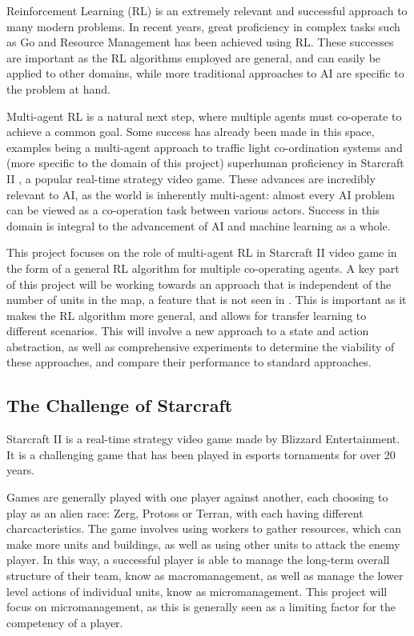 Reinforcement Learning (RL) is an extremely relevant and successful approach to many modern problems. In recent years, great proficiency in complex tasks such as Go \cite{go} and Resource Management \cite{resourcemanagement} has been achieved using RL. These successes are important as the RL algorithms employed are general, and can easily be applied to other domains, while more traditional approaches to AI are specific to the problem at hand. 

Multi-agent RL is a natural next step, where multiple agents must co-operate to achieve a common goal. Some success has already been made in this space, examples being a multi-agent approach to traffic light co-ordination systems \cite{traffic} and (more specific to the domain of this project) superhuman proficiency in Starcraft II \cite{alphastar}, a popular real-time strategy video game. These advances are incredibly relevant to AI, as the world is inherently multi-agent: almost every AI problem can be viewed as a co-operation task between various actors. Success in this domain is integral to the advancement of AI and machine learning as a whole.

This project focuses on the role of multi-agent RL in Starcraft II video game in the form of a general RL algorithm for multiple co-operating agents. A key part of this project will be working towards an approach that is independent of the number of units in the map, a feature that is not seen in \cite{alphastar}. This is important as it makes the RL algorithm more general, and allows for transfer learning to different scenarios. This will involve a new approach to a state and action abstraction, as well as comprehensive experiments to determine the viability of these approaches, and compare their performance to standard approaches.

\subsection{The Challenge of Starcraft}

Starcraft II is a real-time strategy video game made by Blizzard Entertainment. It is a challenging game that has been played in esports tornaments for over 20 years.

Games are generally played with one player against another, each choosing to play as an alien race: Zerg, Protoss or Terran, with each having different charcacteristics. The game involves using workers to gather resources, which can make more units and buildings, as well as using other units to attack the enemy player. In this way, a successful player is able to manage the long-term overall structure of their team, know as macromanagement, as well as manage the lower level actions of individual units, know as micromanagement. This project will focus on micromanagement, as this is generally seen as a limiting factor for the competency of a player.

